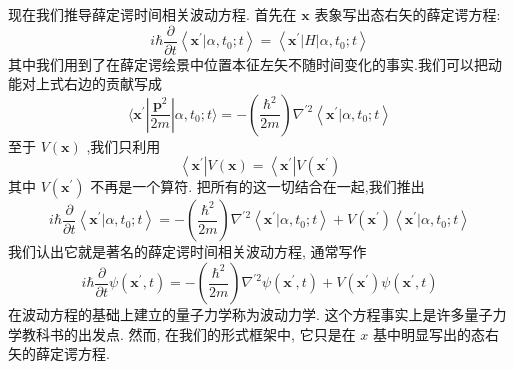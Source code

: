 \documentclass[lang=cn,newtx,10pt,scheme=chinese,thmcnt=section]{elegantbook}
\begin{document}
现在我们推导薛定谔时间相关波动方程. 首先在 $\mathbf{x}$ 表象写出态右矢的薛定谔方程:
\begin{equation}
	i\hbar \frac{\partial }{\partial t}\left\langle {{\mathbf{x}}^{\prime } | \alpha ,{t}_{0};t}\right\rangle = \left\langle {{\mathbf{x}}^{\prime }\left| H\right| \alpha ,{t}_{0};t}\right\rangle
\end{equation}
其中我们用到了在薛定谔绘景中位置本征左矢不随时间变化的事实.我们可以把动能对上式右边的贡献写成
\begin{equation}
	\langle {{\mathbf{x}}^{\prime }| \frac{{\mathbf{p}}^{2}}{2m}| \alpha ,{t}_{0};t}\rangle = - \left( \frac{{\hbar }^{2}}{2m}\right) {\nabla }^{\prime 2}\left\langle {{\mathbf{x}}^{\prime } | \alpha ,{t}_{0};t}\right\rangle
\end{equation}
至于 $V\left( \mathbf{x}\right)$ ,我们只利用
\begin{equation}
	\left\langle {\mathbf{x}}^{\prime }\right| V\left( \mathbf{x}\right) = \left\langle {\mathbf{x}}^{\prime }\right| V\left( {\mathbf{x}}^{\prime }\right)
\end{equation}
其中 $V\left( {\mathbf{x}}^{\prime }\right)$ 不再是一个算符. 把所有的这一切结合在一起,我们推出
\begin{equation}
	i\hbar \frac{\partial }{\partial t}\left\langle {{\mathbf{x}}^{\prime } | \alpha ,{t}_{0};t}\right\rangle = - \left( \frac{{\hbar }^{2}}{2m}\right) {\nabla }^{\prime 2}\left\langle {{\mathbf{x}}^{\prime } | \alpha ,{t}_{0};t}\right\rangle + V\left( {\mathbf{x}}^{\prime }\right) \left\langle {{\mathbf{x}}^{\prime } | \alpha ,{t}_{0};t}\right\rangle
\end{equation}
我们认出它就是著名的薛定谔时间相关波动方程, 通常写作
\begin{equation}
	i\hbar \frac{\partial }{\partial t}\psi \left( {{\mathbf{x}}^{\prime }, t}\right) = - \left( \frac{{\hbar }^{2}}{2m}\right) {\nabla }^{\prime 2}\psi \left( {{\mathbf{x}}^{\prime }, t}\right) + V\left( {\mathbf{x}}^{\prime }\right) \psi \left( {{\mathbf{x}}^{\prime }, t}\right)
\end{equation}
在波动方程的基础上建立的量子力学称为波动力学. 这个方程事实上是许多量子力学教科书的出发点. 然而, 在我们的形式框架中, 它只是在 $x$ 基中明显写出的态右矢的薛定谔方程.
\end{document}
